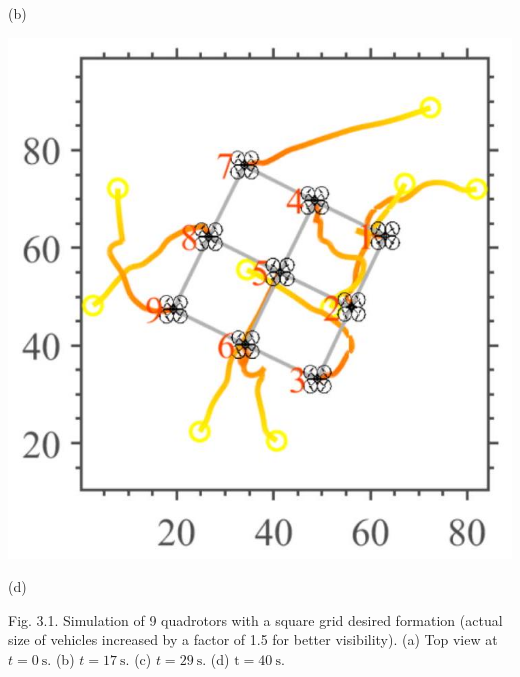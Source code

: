\documentclass[10pt]{article}
\begin{document}
(b)

\begin{center}
\includegraphics[max width=\textwidth]{2023_10_07_53b70c7408bc8e139415g-50(2)}
\end{center}

(d)

Fig. 3.1. Simulation of 9 quadrotors with a square grid desired formation (actual size of vehicles increased by a factor of 1.5 for better visibility). (a) Top view at $t=0 \mathrm{~s}$. (b) $t=17 \mathrm{~s}$. (c) $t=29 \mathrm{~s}$. (d) $\mathrm{t}=40 \mathrm{~s}$.
\end{document}

